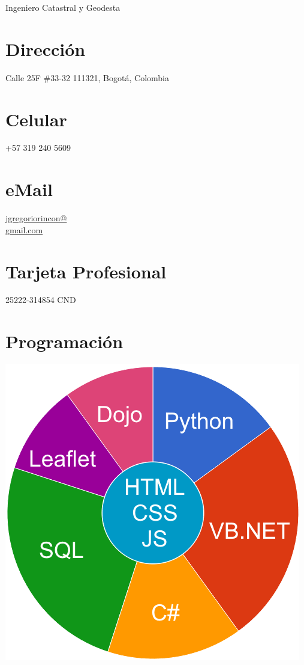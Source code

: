 \documentclass[]{friggeri-cv}
\begin{document}
      {Ingeniero Catastral y Geodesta}
      

\begin{aside}
  \section{Dirección}
    Calle 25F \#33-32
    111321, Bogotá, Colombia
    ~
  \section{Celular}
    +57 319 240 5609
    ~
  \section{eMail}
    \href{mailto:jgregoriorincon@gmail.com}{jgregoriorincon@\\gmail.com}
    ~
  \section{Tarjeta Profesional}
    25222-314854 CND
    ~ 
  \section{Programación}
    \includegraphics[scale=0.30]{img/Skill_Programacion.png}
    ~

\end{aside}
\end{document}
